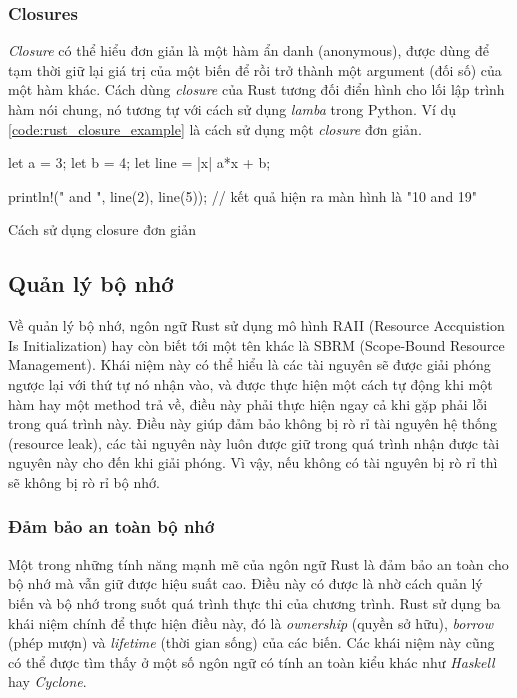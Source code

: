\subsubsection{Closures}
\emph{Closure} có thể hiểu đơn giản là một hàm ẩn danh (anonymous), được dùng để tạm thời giữ lại giá trị của một biến để rồi trở thành một argument (đối số) của một hàm khác.
Cách dùng \emph{closure} của Rust tương đối điển hình cho lối lập trình hàm nói chung, nó tương tự với cách sử dụng \emph{lamba} trong Python.
Ví dụ \ref{code:rust_closure_example} là cách sử dụng một \emph{closure} đơn giản.
\begin{listing}[H]
\begin{rustcode}
let a = 3;
let b = 4;
let line = |x| a*x + b;

println!("{} and {}", line(2), line(5)); // kết quả hiện ra màn hình là "10 and 19"
\end{rustcode}
\caption{Cách sử dụng closure đơn giản}
\label{code:rust_closure_example}
\end{listing}

\subsection{Quản lý bộ nhớ}
Về quản lý bộ nhớ, ngôn ngữ Rust sử dụng mô hình RAII (Resource Accquistion Is Initialization) hay còn biết tới một tên khác là SBRM (Scope-Bound Resource Management).
Khái niệm này có thể hiểu là các tài nguyên sẽ được giải phóng ngược lại với thứ tự nó nhận vào, và được thực hiện một cách tự động khi một hàm hay một method trả về, điều này phải thực hiện ngay cả khi gặp phải lỗi trong quá trình này.
Điều này giúp đảm bảo không bị rò rỉ tài nguyên hệ thống (resource leak), các tài nguyên này luôn được giữ trong quá trình nhận được tài nguyên này cho đến khi giải phóng. Vì vậy, nếu không có tài nguyên bị rò rỉ thì sẽ không bị rò rỉ bộ nhớ.

\subsubsection{Đảm bảo an toàn bộ nhớ}
Một trong những tính năng mạnh mẽ của ngôn ngữ Rust là đảm bảo an toàn cho bộ nhớ mà vẫn giữ được hiệu suất cao.
Điều này có được là nhờ cách quản lý biến và bộ nhớ trong suốt quá trình thực thi của chương trình.
Rust sử dụng ba khái niệm chính để thực hiện điều này, đó là \emph{ownership} (quyền sở hữu), \emph{borrow} (phép mượn) và \emph{lifetime} (thời gian sống) của các biến.
Các khái niệm này cũng có thể được tìm thấy ở một số ngôn ngữ có tính an toàn kiểu khác như \emph{Haskell} hay \emph{Cyclone}.

